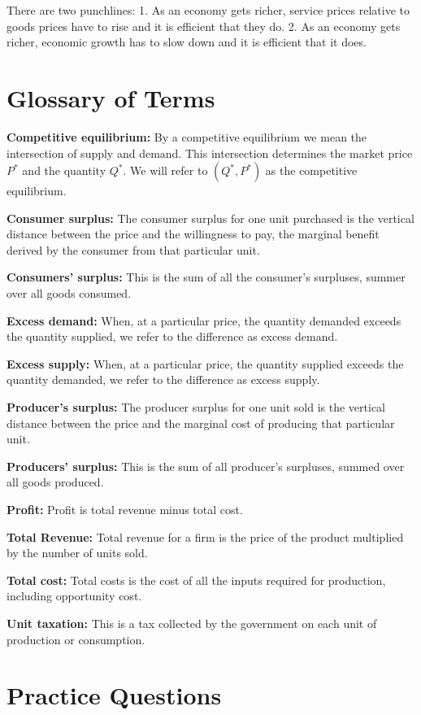 \documentclass[
]{book}
\begin{document}
There are two punchlines:
1. As an economy gets richer, service prices relative to goods prices have to rise and it is efficient that they do.
2. As an economy gets richer, economic growth has to slow down and it is efficient that it does.

\hypertarget{glossary-of-terms-5}{%
\section{Glossary of Terms}\label{glossary-of-terms-5}}

\textbf{Competitive equilibrium:} By a competitive equilibrium we mean the intersection of supply and demand. This intersection determines the market price \(P^*\) and the quantity \(Q^*\). We will refer to \((Q^*, P^*)\) as the competitive equilibrium.

\textbf{Consumer surplus:} The consumer surplus for one unit purchased is the vertical distance between the price and the willingness to pay, the marginal benefit derived by the consumer from that particular unit.

\textbf{Consumers' surplus:} This is the sum of all the consumer's surpluses, summer over all goods consumed.

\textbf{Excess demand:} When, at a particular price, the quantity demanded exceeds the quantity supplied, we refer to the difference as excess demand.

\textbf{Excess supply:} When, at a particular price, the quantity supplied exceeds the quantity demanded, we refer to the difference as excess supply.

\textbf{Producer's surplus:} The producer surplus for one unit sold is the vertical distance between the price and the marginal cost of producing that particular unit.

\textbf{Producers' surplus:} This is the sum of all producer's surpluses, summed over all goods produced.

\textbf{Profit:} Profit is total revenue minus total cost.

\textbf{Total Revenue:} Total revenue for a firm is the price of the product multiplied by the number of units sold.

\textbf{Total cost:} Total costs is the cost of all the inputs required for production, including opportunity cost.

\textbf{Unit taxation:} This is a tax collected by the government on each unit of production or consumption.

\hypertarget{practice-questions-5}{%
\section{Practice Questions}\label{practice-questions-5}}
\end{document}
